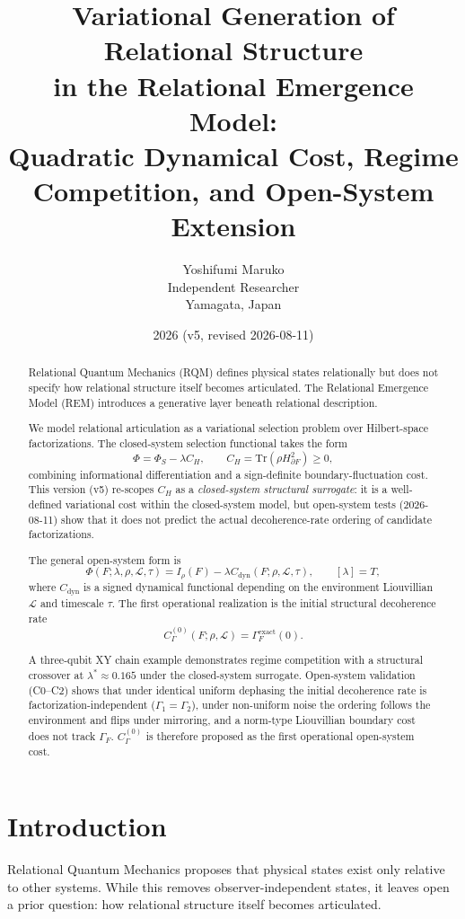 \documentclass[11pt]{article}
\title{Variational Generation of Relational Structure\\in the Relational Emergence Model:\\{\normalsize Quadratic Dynamical Cost, Regime Competition, and Open-System Extension}}
\author{Yoshifumi Maruko\\Independent Researcher\\Yamagata, Japan}
\date{2026 (v5, revised 2026-08-11)}
\begin{document}
\maketitle

\begin{abstract}
Relational Quantum Mechanics (RQM) defines physical states relationally but does not specify how relational structure itself becomes articulated. The Relational Emergence Model (REM) introduces a generative layer beneath relational description.

We model relational articulation as a variational selection problem over Hilbert-space factorizations. The closed-system selection functional takes the form
\[
\Phi = \Phi_S - \lambda C_H,
\qquad
C_H = \mathrm{Tr}(\rho H_{\partial F}^2) \geq 0,
\]
combining informational differentiation and a sign-definite boundary-fluctuation cost. This version (v5) re-scopes $C_H$ as a \emph{closed-system structural surrogate}: it is a well-defined variational cost within the closed-system model, but open-system tests (2026-08-11) show that it does not predict the actual decoherence-rate ordering of candidate factorizations.

The general open-system form is
\[
\Phi(F;\lambda,\rho,\mathcal L,\tau)
= I_\rho(F) - \lambda C_{\mathrm{dyn}}(F;\rho,\mathcal L,\tau),
\qquad [\lambda]=T,
\]
where $C_{\mathrm{dyn}}$ is a signed dynamical functional depending on the environment Liouvillian $\mathcal L$ and timescale $\tau$. The first operational realization is the initial structural decoherence rate
\[
C_\Gamma^{(0)}(F;\rho,\mathcal L) = \Gamma_F^{\mathrm{exact}}(0).
\]

A three-qubit XY chain example demonstrates regime competition with a structural crossover at $\lambda^*\approx0.165$ under the closed-system surrogate. Open-system validation (C0--C2) shows that under identical uniform dephasing the initial decoherence rate is factorization-independent ($\Gamma_1=\Gamma_2$), under non-uniform noise the ordering follows the environment and flips under mirroring, and a norm-type Liouvillian boundary cost does not track $\Gamma_F$. $C_\Gamma^{(0)}$ is therefore proposed as the first operational open-system cost.
\end{abstract}

\section{Introduction}
Relational Quantum Mechanics proposes that physical states exist only relative to other systems. While this removes observer-independent states, it leaves open a prior question: how relational structure itself becomes articulated.
\end{document}
